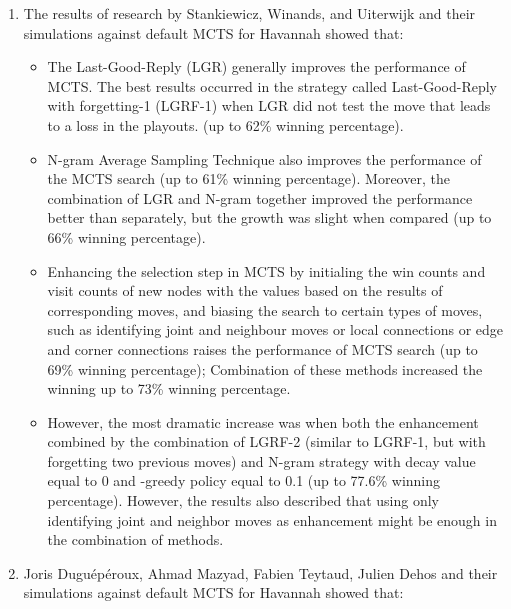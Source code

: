 \documentclass[paper=8.27in:11.69in]{scrartcl}
\begin{document}
\begin{enumerate}[label=\arabic*)]
\item The results of research by Stankiewicz, Winands, and Uiterwijk \cite{Stankiewicz2011MonteCarloTS} and their simulations against default MCTS for Havannah showed that:\\

\begin{itemize}

\item The Last-Good-Reply (LGR) generally improves the performance of MCTS. The best results occurred in the strategy called Last-Good-Reply with forgetting-1 (LGRF-1) when LGR did not test the move that leads to a loss in the playouts. (up to 62\% winning percentage).
\item N-gram Average Sampling Technique also improves the performance of the MCTS search (up to 61\% winning percentage). Moreover, the combination of LGR and N-gram together improved the performance better than separately, but the growth was slight when compared (up to 66\% winning percentage).
\item Enhancing the selection step in MCTS by initialing the win counts and visit counts of new nodes with the values based on the results of corresponding moves, and biasing the search to certain types of moves, such as identifying joint and neighbour moves or local connections or edge and corner connections raises the performance of MCTS search (up to 69\% winning percentage); Combination of these methods increased the winning up to 73\% winning percentage.
\item However, the most dramatic increase was when both the enhancement combined by the combination of LGRF-2 (similar to LGRF-1, but with forgetting two previous moves) and N-gram strategy with decay value \gamma equal to 0 and \epsilon-greedy policy equal to 0.1 (up to 77.6\% winning percentage). However, the results also described that using only identifying joint and neighbor moves as enhancement might be enough in the combination of methods.
\end{itemize}
\item Joris Duguépéroux, Ahmad Mazyad, Fabien Teytaud, Julien Dehos \cite{Duguproux2016PruningPI} and their simulations against default MCTS for Havannah showed that:

\begin{itemize}


\end{itemize}
\end{enumerate}
\end{document}
